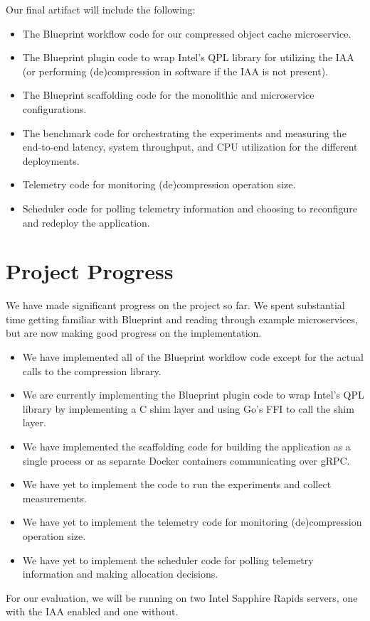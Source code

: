 \documentclass[letterpaper,twocolumn,10pt]{article}
\begin{document}
Our final artifact will include the following:
\begin{itemize}
    \item The Blueprint workflow code for our compressed object cache microservice.
    \item The Blueprint plugin code to wrap Intel's QPL library for utilizing the IAA (or performing (de)compression in software if the IAA is not present).
    \item The Blueprint scaffolding code for the monolithic and microservice configurations.
    \item The benchmark code for orchestrating the experiments and measuring the end-to-end latency, system throughput, and CPU utilization for the different deployments.
    \item Telemetry code for monitoring (de)compression operation size.
    \item Scheduler code for polling telemetry information and choosing to reconfigure and redeploy the application.
\end{itemize}

\section{Project Progress}

We have made significant progress on the project so far. 
We spent substantial time getting familiar with Blueprint and reading through example microservices, but are now making good progress on the implementation.
\begin{itemize}
    \item We have implemented all of the Blueprint workflow code except for the actual calls to the compression library.
    \item We are currently implementing the Blueprint plugin code to wrap Intel's QPL library by implementing a C shim layer and using Go's FFI to call the shim layer.
    \item We have implemented the scaffolding code for building the application as a single process or as separate Docker containers communicating over gRPC.
    \item We have yet to implement the code to run the experiments and collect measurements.
    \item We have yet to implement the telemetry code for monitoring (de)compression operation size.
    \item We have yet to implement the scheduler code for polling telemetry information and making allocation decisions.
\end{itemize}
For our evaluation, we will be running on two Intel Sapphire Rapids servers, one with the IAA enabled and one without.



\end{document}
